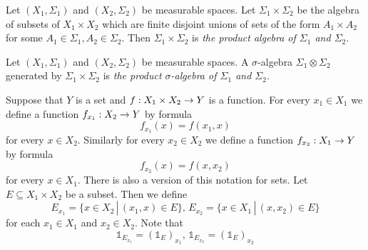 \begin{definition}
    Let $(X_1,\Sigma_1)$ and $(X_2,\Sigma_2)$ be measurable spaces. Let $\Sigma_1\times \Sigma_2$ be the algebra of subsets of $X_1\times X_2$ which are finite disjoint unions of sets of the form $A_1\times A_2$ for some $A_1 \in \Sigma_1,A_2\in \Sigma_2$. Then $\Sigma_1\times \Sigma_2$ is \textit{the product algebra of $\Sigma_1$ and $\Sigma_2$}. 
\end{definition}

\begin{definition}
    Let $(X_1,\Sigma_1)$ and $(X_2,\Sigma_2)$ be measurable spaces. A $\sigma$-algebra $\Sigma_1\otimes \Sigma_2$ generated by $\Sigma_1\times \Sigma_2$ is \textit{the product $\sigma$-algebra of $\Sigma_1$ and $\Sigma_2$}.
\end{definition}
\noindent
Suppose that $Y$ is a set and $f:X_1\times X_2\rightarrow Y$ is a function. For every $x_1\in X_1$ we define a function $f_{x_1}:X_2\rightarrow Y$ by formula
$$f_{x_1}(x) = f(x_1,x)$$
for every $x \in X_2$. Similarly for every $x_2\in X_2$ we define a function $f_{x_2}:X_1\rightarrow Y$ by formula
$$f_{x_2}(x) = f(x,x_2)$$
for every $x \in X_1$. There is also a version of this notation for sets. Let $E\subseteq X_1\times X_2$ be a subset. Then we define
$$E_{x_1} = \{x\in X_2\,|\,(x_1,x)\in E\},\,E_{x_2} = \{x\in X_1\,|\,(x,x_2)\in E\}$$
for each $x_1\in X_1$ and $x_2\in X_2$. Note that
$$\mathbb{1}_{E_{x_1}} = \left(\mathbb{1}_E\right)_{x_1},\,\mathbb{1}_{E_{x_2}} = \left(\mathbb{1}_E\right)_{x_2}$$

